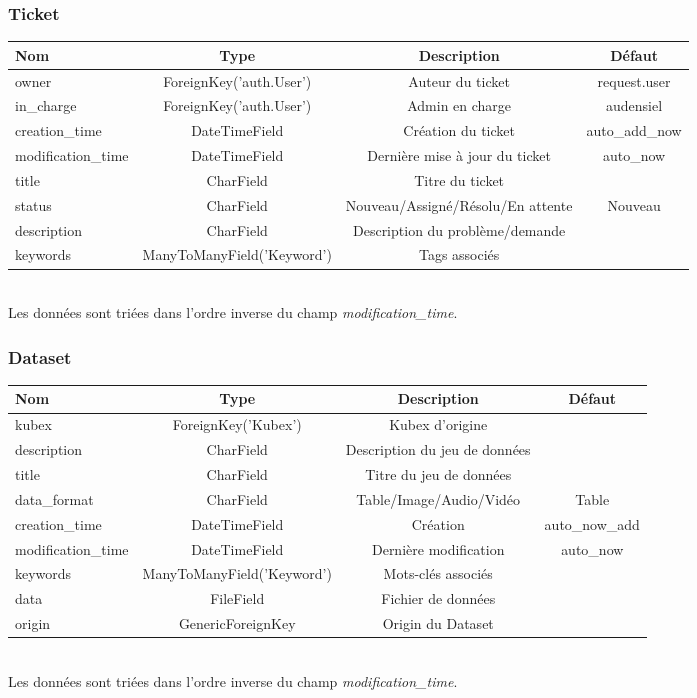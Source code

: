 \documentclass[a4paper]{report}
\begin{document}
\subsubsection{Ticket}
\begin{adjustbox}{center}\begin{tabular}{|l|c|c|c|}
		\hline
		\textbf{Nom} & \textbf{Type} & \textbf{Description} & \textbf{Défaut}\\
		\hline
		owner & ForeignKey('auth.User') & Auteur du ticket & request.user \\
		in\_charge & ForeignKey('auth.User') & Admin en charge & audensiel \\
		creation\_time  & DateTimeField & Création  du ticket & auto\_add\_now \\
		modification\_time & DateTimeField & Dernière mise à jour du ticket & auto\_now \\
		title & CharField & Titre du ticket & \\
		status & CharField & Nouveau/Assigné/Résolu/En attente & Nouveau \\
		description & CharField & Description du problème/demande & \\
		keywords & ManyToManyField('Keyword') & Tags associés & \\
		\hline
\end{tabular}\end{adjustbox}
~\\
Les données sont triées dans l'ordre inverse du champ \emph{modification\_time}.

\subsubsection{Dataset}
\begin{adjustbox}{center}\begin{tabular}{|l|c|c|c|}
		\hline
		\textbf{Nom} & \textbf{Type} & \textbf{Description} & \textbf{Défaut}\\
		\hline
		kubex & ForeignKey('Kubex') & Kubex d'origine & \\
		description & CharField & Description du jeu de données & \\
		title & CharField & Titre du jeu de données & \\
		data\_format  & CharField & Table/Image/Audio/Vidéo & Table \\
		creation\_time & DateTimeField & Création & auto\_now\_add \\
		modification\_time & DateTimeField & Dernière modification & auto\_now \\
		keywords & ManyToManyField('Keyword') & Mots-clés associés & \\
		data & FileField & Fichier de données & \\
		origin & GenericForeignKey & Origin du Dataset & \\
		\hline
\end{tabular}\end{adjustbox}
~\\
Les données sont triées dans l'ordre inverse du champ \emph{modification\_time}.
\end{document}
